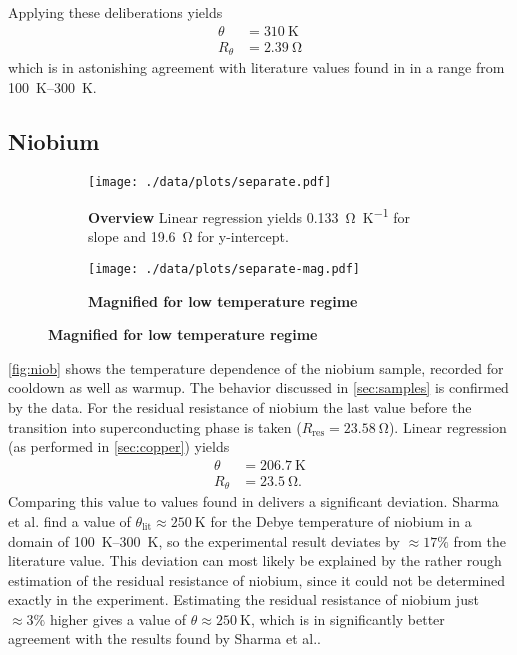 Applying these deliberations yields
\begin{align*}
	\theta &= \SI{310}{\kelvin} \\
	R_\theta &= \SI{2.39}{\ohm}
\end{align*}
which is in astonishing agreement with literature values found in \cite{debyecu} in a range from \SIrange{100}{300}{\kelvin}.

\subsection{Niobium}
\begin{figure}
\begin{adjustwidth}{-1cm}{-1cm}
	\centering
	\begin{subfigure}{.55\textwidth}
		\centering
		\texttt{[image: ./data/plots/separate.pdf]}
		\caption{\textbf{Overview} Linear regression yields \SI{0.133}{\ohm\per\kelvin} for slope and \SI{19.6}{\ohm} for y-intercept.}
	\end{subfigure}
	\hfill
	\begin{subfigure}{.55\textwidth}
		\centering
		\texttt{[image: ./data/plots/separate-mag.pdf]}
		\caption{\textbf{Magnified for low temperature regime}}
	\end{subfigure}
	\label{fig:niob}
\end{adjustwidth}
\end{figure}

\autoref{fig:niob} shows the temperature dependence of the niobium sample, recorded for cooldown as well as warmup.
The behavior discussed in \autoref{sec:samples} is confirmed by the data.
For the residual resistance of niobium the last value before the transition into superconducting phase is taken ($R_\text{res}=\SI{23.58}{\ohm}$).
Linear regression (as performed in \autoref{sec:copper}) yields
\begin{align*}
	\theta &= \SI{206.7}{\kelvin} \\
	R_\theta &= \SI{23.5}{\ohm}.
\end{align*}
Comparing this value to values found in \cite{debyenb} delivers a significant deviation.
Sharma et al. find a value of $\theta_\text{lit}\approx\SI{250}{\kelvin}$ for the Debye temperature of niobium in a domain of \SIrange{100}{300}{\kelvin}, so the experimental result deviates by $\approx 17\%$ from the literature value.
This deviation can most likely be explained by the rather rough estimation of the residual resistance of niobium, since it could not be determined exactly in the experiment. Estimating the residual resistance of niobium just $\approx 3\%$ higher gives a value of $\theta\approx\SI{250}{\kelvin}$, which is in significantly better agreement with the results found by Sharma et al..

